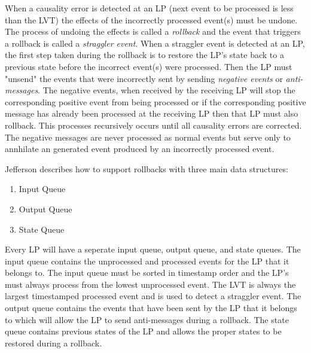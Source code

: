 \documentclass[11pt]{book}
\begin{document}
When a causality error is detected at an LP (next event to be processed is less than the
LVT) the effects of the incorrectly processed event(s) must be undone.  The process
of undoing the effects is called a \emph{rollback} and the event that triggers a rollback
is called a \emph{straggler event}.  When a straggler event is detected at an LP, the first
step taken during the rollback is to restore the LP's state back to a previous state before
the incorrect event(s) were processed.  Then the LP must "unsend" the events that were
incorrectly sent by sending \emph{negative events} or \emph{anti-messages}.  The negative
events, when received by the receiving LP will stop the corresponding positive event from
being processed or if the corresponding positive message has already been processed at
the receiving LP then that LP must also rollback.  This processes recursively occurs until
all causality errors are corrected.  The negative messages are never processed as normal
events but serve only to annhilate an generated event produced by an incorrectly processed
event.

Jefferson\cite{jefferson-85} describes how to support rollbacks with three main data structures:

\begin{enumerate}
    \item Input Queue
    \item Output Queue
    \item State Queue
\end{enumerate}

\noindent
Every LP will have a seperate input queue, output queue, and state queues.  The input
queue contains the unprocessed and processed events for the LP that it belongs to.  The
input queue must be sorted in timestamp order and the LP's must always process from the
lowest unprocessed event.  The LVT is always the largest timestamped processed event and
is used to detect a straggler event.  The output queue contains the events that have been
sent by the LP that it belongs to which will allow the LP to send anti-messages during a
rollback.  The state queue contains previous states of the LP and allows the proper states
to be restored during a rollback.
\end{document}
